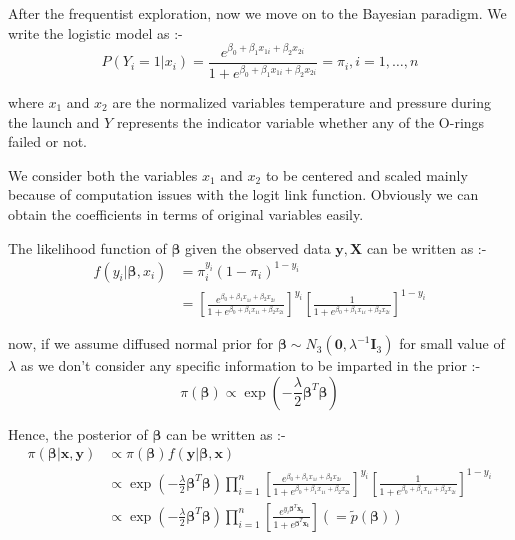 \documentclass[11pt,english]{article}\usepackage[]{graphicx}\usepackage[]{xcolor}
\begin{document}
After the frequentist exploration, now we move on to the Bayesian
paradigm. We write the logistic model as :-
\[
P\left(Y_{i}=1|x_{i}\right)=\frac{e^{\beta_{0}+\beta_{1}x_{1i}+\beta_{2}x_{2i}}}{1+e^{\beta_{0}+\beta_{1}x_{1i}+\beta_{2}x_{2i}}}=\pi_{i},i=1,\dots,n
\]

where $x_{1}$ and $x_{2}$ are the normalized variables temperature
and pressure during the launch and $Y$ represents the indicator variable
whether any of the O-rings failed or not.

We consider both the variables $x_{1}$ and $x_{2}$ to be centered
and scaled mainly because of computation issues with the logit link
function. Obviously we can obtain the coefficients in terms of original
variables easily.

The likelihood function of $\boldsymbol{\beta}$ given the observed
data $\boldsymbol{y,X}$ can be written as :-
\begin{align*}
f\left(y_{i}|\boldsymbol{\beta},x_{i}\right) & =\pi_{i}^{y_{i}}\left(1-\pi_{i}\right)^{1-y_{i}}\\
 & =\left[\frac{e^{\beta_{0}+\beta_{1}x_{1i}+\beta_{2}x_{2i}}}{1+e^{\beta_{0}+\beta_{1}x_{1i}+\beta_{2}x_{2i}}}\right]^{y_{i}}\left[\frac{1}{1+e^{\beta_{0}+\beta_{1}x_{1i}+\beta_{2}x_{2i}}}\right]^{1-y_{i}}
\end{align*}

now, if we assume diffused normal prior for $\boldsymbol{\beta}\sim N_{3}\left(\boldsymbol{0},\lambda^{-1}\boldsymbol{I}_{3}\right)$
for small value of $\lambda$ as we don't consider any specific information
to be imparted in the prior :-
\[
\pi\left(\boldsymbol{\beta}\right)\propto\exp\left(-\frac{\lambda}{2}\boldsymbol{\beta}^{T}\boldsymbol{\beta}\right)
\]

Hence, the posterior of $\boldsymbol{\beta}$ can be written as :-
\begin{align*}
\pi\left(\boldsymbol{\beta}|\boldsymbol{x},\boldsymbol{y}\right) & \propto\pi\left(\boldsymbol{\beta}\right)f\left(\boldsymbol{y}|\boldsymbol{\beta},\boldsymbol{x}\right)\\
 & \propto\exp\left(-\frac{\lambda}{2}\boldsymbol{\beta}^{T}\boldsymbol{\beta}\right)\prod_{i=1}^{n}\left[\frac{e^{\beta_{0}+\beta_{1}x_{1i}+\beta_{2}x_{2i}}}{1+e^{\beta_{0}+\beta_{1}x_{1i}+\beta_{2}x_{2i}}}\right]^{y_{i}}\left[\frac{1}{1+e^{\beta_{0}+\beta_{1}x_{1i}+\beta_{2}x_{2i}}}\right]^{1-y_{i}}\\
 & \propto\exp\left(-\frac{\lambda}{2}\boldsymbol{\beta}^{T}\boldsymbol{\beta}\right)\prod\limits _{i=1}^{n}\left[\frac{e^{y_{i}\boldsymbol{\beta}^{T}\boldsymbol{x_{i}}}}{1+e^{\boldsymbol{\beta}^{T}\boldsymbol{x_{i}}}}\right]\left(=\widetilde{p}\left(\boldsymbol{\beta}\right)\right)
\end{align*}
\end{document}
